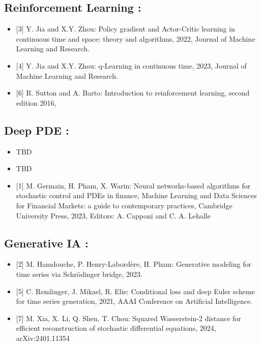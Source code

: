 \documentclass[
  10,
  letterpaper,
  DIV=11,
  numbers=noendperiod]{scrreport}
\newlength{\cslhangindent}
\newenvironment{CSLReferences}[2] %
 {\begin{list}{}{%
  \setlength{\itemindent}{0pt}
  \setlength{\leftmargin}{0pt}
  \setlength{\parsep}{0pt}
  \ifodd #1
   \setlength{\leftmargin}{\cslhangindent}
   \setlength{\itemindent}{-1\cslhangindent}
  \fi
  \setlength{\itemsep}{#2\baselineskip}}}
 {\end{list}}
\theoremstyle{definition}
\theoremstyle{definition}
\theoremstyle{plain}
\theoremstyle{remark}
\begin{document}

\label{refs}
\begin{CSLReferences}{0}{1}
\end{CSLReferences}

\subsection*{Reinforcement Learning :}\label{reinforcement-learning}

\begin{itemize}
\item
  {[}3{]} Y. Jia and X.Y. Zhou: Policy gradient and Actor-Critic
  learning in continuous time and space: theory and algorithms, 2022,
  Journal of Machine Learning and Research.
\item
  {[}4{]} Y. Jia and X.Y. Zhou: q-Learning in continuous time, 2023,
  Journal of Machine Learning and Research.
\item
  {[}6{]} R. Sutton and A. Barto: Introduction to reinforcement
  learning, second edition 2016,
\end{itemize}

\subsection*{Deep PDE :}\label{deep-pde}

\begin{itemize}
\item
  TBD
\item
  TBD
\item
  {[}1{]} M. Germain, H. Pham, X. Warin: Neural networks-based
  algorithms for stochastic control and PDEs in finance, Machine
  Learning and Data Sciences for Financial Markets: a guide to
  contemporary practices, Cambridge University Press, 2023, Editors: A.
  Capponi and C. A. Lehalle
\end{itemize}

\subsection*{Generative IA :}\label{generative-ia}

\begin{itemize}
\item
  {[}2{]} M. Hamdouche, P. Henry-Labordère, H. Pham: Generative modeling
  for time series via Schrödinger bridge, 2023.
\item
  {[}5{]} C. Remlinger, J. Mikael, R. Elie: Conditional loss and deep
  Euler scheme for time series generation, 2021, AAAI Conference on
  Artificial Intelligence.
\item
  {[}7{]} M. Xia, X. Li, Q. Shen, T. Chou: Squared Wasserstein-2
  distance for efficient reconstruction of stochastic differential
  equations, 2024, arXiv:2401.11354
\end{itemize}
\end{document}
